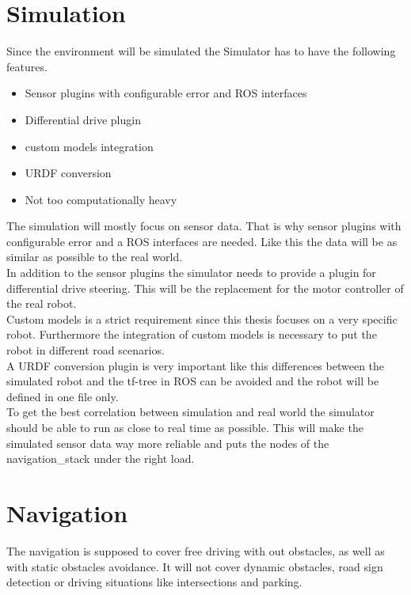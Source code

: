 \section{Simulation}
Since the environment will be simulated the Simulator has to have the following features.
\begin{itemize}
	\item Sensor plugins with configurable error and ROS interfaces
	\item Differential drive plugin
	\item custom models integration
	\item URDF conversion
	\item Not too computationally heavy
\end{itemize}

The simulation will mostly focus on sensor data. That is why sensor plugins with configurable error and a ROS interfaces are needed. Like this the data will be as similar as possible to the real world.\\

In addition to the sensor plugins the simulator needs to provide a plugin for differential drive steering. This will be the replacement for the motor controller of the real robot.\\

Custom models is a strict requirement since this thesis focuses on a very specific robot. Furthermore the integration of custom models is necessary to put the robot in different road scenarios.\\

A URDF conversion plugin is very important like this differences between the simulated robot and the tf-tree in ROS can be avoided and the robot will be defined in one file only.\\

To get the best correlation between simulation and real world the simulator should be able to run as close to real time as possible. This will make the simulated sensor data way more reliable and puts the nodes of the navigation\_stack under the right load.

\section{Navigation}
The navigation is supposed to cover free driving with out obstacles, as well as with static obstacles avoidance. It will not cover dynamic obstacles, road sign detection or driving situations like intersections and parking.\\

